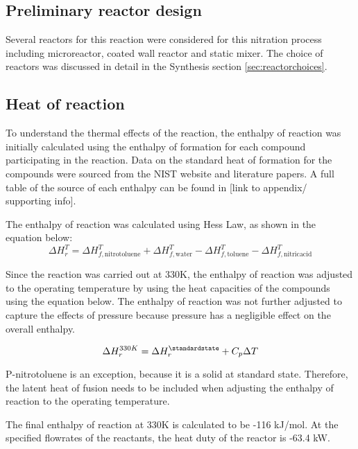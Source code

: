 \subsection{Preliminary reactor design}
Several reactors for this reaction were considered for this nitration process including microreactor, coated wall reactor and static mixer. The choice of reactors was discussed in detail in the Synthesis section \ref{sec:reactorchoices}.

\subsection{Heat of reaction}
To understand the thermal effects of the reaction, the enthalpy of reaction was initially calculated using the enthalpy of formation for each compound participating in the reaction. Data on the standard heat of formation for the compounds were sourced from the NIST website and literature papers. A full table of the source of each enthalpy can be found in [link to appendix/ supporting info]. 

The enthalpy of reaction was calculated using Hess Law, as shown in the equation below:
\begin{equation}
  \Delta H_{r}^{T} = \Delta H_{f,\mathrm{nitrotoluene}}^{T} + \Delta H_{f,\mathrm{water}}^{T} - \Delta H_{f,\mathrm{toluene}}^{T} - \Delta H_{f,\mathrm{nitric acid}}^{T}
\end{equation}

Since the reaction was carried out at 330K, the enthalpy of reaction was adjusted to the operating temperature by using the heat capacities of the compounds using the equation below. The enthalpy of reaction was not further adjusted to capture the effects of pressure because pressure has a negligible effect on the overall enthalpy. 

\begin{equation}
  \Delta H_{r}^{330K} = \Delta H_{r}^{\standardstate} + C_p \Delta T
\end{equation}

P-nitrotoluene is an exception, because it is a solid at standard state. Therefore, the latent heat of fusion needs to be included when adjusting the enthalpy of reaction to the operating temperature. 

The final enthalpy of reaction at 330K is calculated to be -116 kJ/mol. At the specified flowrates of the reactants, the heat duty of the reactor is -63.4 kW.

